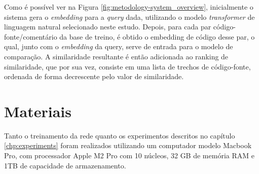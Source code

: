 Como é possível ver na Figura \ref{fig:metodology-system_overview}, inicialmente o sistema gera o \textit{embedding} para a \textit{query} dada, utilizando o modelo \textit{transformer} de linguagem natural selecionado neste estudo. Depois, para cada par código-fonte/comentário da base de treino, é obtido o embedding de código desse par, o qual, junto com o \textit{embedding} da query, serve de entrada para o modelo de comparação. A similaridade resultante é então adicionada ao ranking de similaridade, que por sua vez, consiste em uma lista de trechos de código-fonte, ordenada de forma decrescente pelo valor de similaridade.

\section{Materiais}
Tanto o treinamento da rede quanto os experimentos descritos no capítulo \ref{chp:experiments} foram realizados utilizando um computador modelo Macbook Pro, com processador Apple M2 Pro com 10 núcleos, 32 GB de memória RAM e 1TB de capacidade de armazenamento.